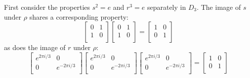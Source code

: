 First consider the properties $s^2=e$ and $r^3 = e$ separately in $D_3$.
The image of $s$ under $\rho$ shares a corresponding property:
\[
    \begin{bmatrix}
        0 & 1 \\
        1 & 0 \\    
    \end{bmatrix} \begin{bmatrix}
        0 & 1 \\
        1 & 0 \\    
    \end{bmatrix} = \begin{bmatrix}
        1 & 0 \\
        0 & 1 \\    
    \end{bmatrix}
\]
as does the image of $r$ under $\rho$:
\[
    \begin{bmatrix}
        e^{2\pi i/3} & 0\\
        0 & e^{-2\pi i/3} \\
    \end{bmatrix} \begin{bmatrix}
        e^{2\pi i/3} & 0\\
        0 & e^{-2\pi i/3} \\
    \end{bmatrix} \begin{bmatrix}
        e^{2\pi i/3} & 0\\
        0 & e^{-2\pi i/3} \\
    \end{bmatrix} = \begin{bmatrix}
        1 & 0 \\
        0 & 1 \\    
    \end{bmatrix}
\]